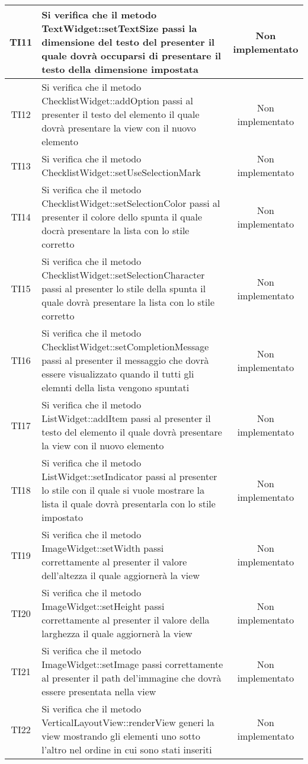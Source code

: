 \begin{center}
\begin{longtable}{|c|>{\centering}m{10cm}|c|}
		TI11 & Si verifica che il metodo TextWidget::setTextSize passi la dimensione del testo del presenter il quale dovrà occuparsi di presentare il testo della dimensione impostata & Non implementato \\ \hline
		TI12 & Si verifica che il metodo ChecklistWidget::addOption passi al presenter il testo del elemento il quale dovrà presentare la view con il nuovo elemento & Non implementato \\ \hline
		TI13 & Si verifica che il metodo ChecklistWidget::setUseSelectionMark  & Non implementato \\ \hline
		TI14 & Si verifica che il metodo ChecklistWidget::setSelectionColor passi al presenter il colore dello spunta il quale docrà presentare la lista con lo stile corretto & Non implementato \\ \hline
		TI15 & Si verifica che il metodo ChecklistWidget::setSelectionCharacter passi al presenter lo stile della spunta il quale dovrà presentare la lista con lo stile corretto & Non implementato \\ \hline
		TI16 & Si verifica che il metodo ChecklistWidget::setCompletionMessage passi al presenter il messaggio che dovrà essere visualizzato quando il tutti gli elemnti della lista vengono spuntati & Non implementato \\ \hline
		TI17 & Si verifica che il metodo ListWidget::addItem passi al presenter il testo del elemento il quale dovrà presentare la view con il nuovo elemento & Non implementato \\ \hline
		TI18 & Si verifica che il metodo ListWidget::setIndicator passi al presenter lo stile con il quale si vuole mostrare la lista il quale dovrà presentarla con lo stile impostato & Non implementato \\ \hline
		TI19 & Si verifica che il metodo ImageWidget::setWidth passi correttamente al presenter il valore dell'altezza il quale aggiornerà la view & Non implementato \\ \hline
		TI20 & Si verifica che il metodo ImageWidget::setHeight passi correttamente al presenter il valore della larghezza il quale aggiornerà la view & Non implementato \\ \hline
		TI21 & Si verifica che il metodo ImageWidget::setImage passi correttamente al presenter il path del'immagine che dovrà essere presentata nella view & Non implementato \\ \hline
		TI22 & Si verifica che il metodo VerticalLayoutView::renderView generi la view mostrando gli elementi uno sotto l'altro nel ordine in cui sono stati inseriti & Non implementato \\ \hline

\end{longtable}
\end{center}
